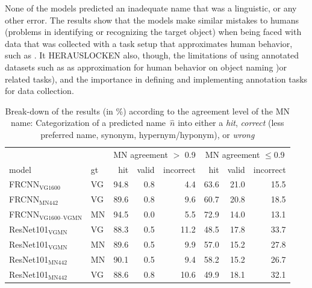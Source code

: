 None of the models predicted an inadequate name that was a linguistic, or any other error. 
The results show that the models make similar mistakes to humans (problems in identifying or recognizing the target object) when being faced with data that was collected with a task setup that approximates human behavior, such as \mn.  
It HERAUSLOCKEN also, though, the limitations of using annotated datasets such as \mn as approximation for human behavior on object naming )or related tasks), and the importance in defining and implementing annotation tasks for data collection. 


\begin{table}[t]
\centering
	\small
\begin{tabular}{ll|rrr|rrr}
\toprule
&  & \multicolumn{3}{c|}{MN agreement $>$ 0.9} & \multicolumn{3}{c}{MN agreement $\leq$0.9}\\
                         model &  gt &  hit &  valid &  incorrect &  hit &  valid &  incorrect \\
\midrule
       FRCNN$_{\text{VG1600}}$ &  VG &   94.8 &      0.8 &      4.4 &   63.6 &     21.0 &     15.5 \\
        FRCNN$_{\text{MN442}}$ &  VG &   89.6 &      0.8 &      9.6 &   60.7 &     20.8 &     18.5 \\
                \midrule
 FRCNN$_{\text{VG1600--VGMN}}$ &  MN &   94.5 &      0.0 &      5.5 &   72.9 &     14.0 &     13.1 \\
         \midrule
     ResNet101$_{\text{VGMN}}$ &  VG &   88.3 &      0.5 &     11.2 &   48.5 &     17.8 &     33.7 \\
     ResNet101$_{\text{VGMN}}$ &  MN &   89.6 &      0.5 &      9.9 &   57.0 &     15.2 &     27.8 \\
    ResNet101$_{\text{MN442}}$ &  MN &   90.1 &      0.5 &      9.4 &   58.2 &     15.2 &     26.7 \\
    ResNet101$_{\text{MN442}}$ &  VG &   88.6 &      0.8 &     10.6 &   49.9 &     18.1 &     32.1 \\
\bottomrule
\end{tabular}
\caption{Break-down of the results (in \%) according to the agreement level of the MN name: Categorization of a predicted name\ $\hat{n}$ into either a \textit{hit}, \textit{correct} (less preferred name, synonym, hypernym/hyponym), or \textit{wrong} \label{tab:exp_errors_agreement}}
\end{table}

